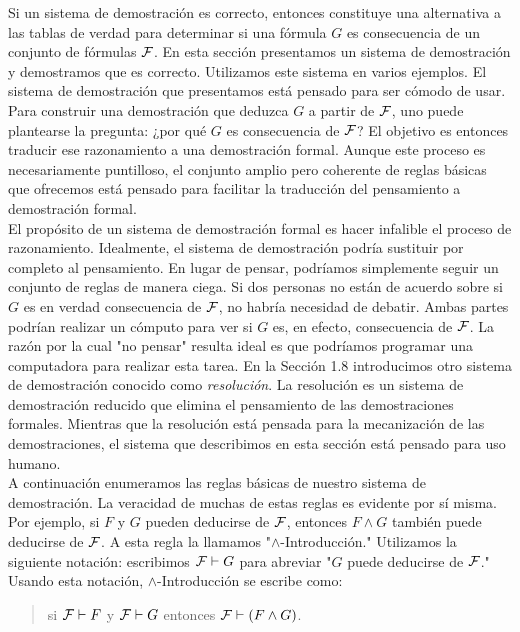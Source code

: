 \documentclass[12pt,a4paper]{book}
\newcommand{\comillas}[1]{"#1"}
\begin{document}
    Si un sistema de demostración es correcto, entonces constituye una alternativa a las tablas de verdad para determinar si una
    fórmula $G$ es consecuencia de un conjunto de fórmulas $\mathcal{F}$. En esta sección presentamos un sistema de demostración y
    demostramos que es correcto. Utilizamos este sistema en varios ejemplos. El sistema de demostración que presentamos está
    pensado para ser cómodo de usar. Para construir una demostración que deduzca $G$ a partir de $\mathcal{F}$, uno puede plantearse la
    pregunta: ¿por qué $G$ es consecuencia de $\mathcal{F}$? El objetivo es entonces traducir ese razonamiento a una demostración formal.
    Aunque este proceso es necesariamente puntilloso, el conjunto amplio pero coherente de reglas básicas que ofrecemos está
    pensado para facilitar la traducción del pensamiento a demostración formal.\\
    El propósito de un sistema de demostración formal es hacer infalible el proceso de razonamiento. Idealmente, el sistema de
    demostración podría sustituir por completo al pensamiento. En lugar de pensar, podríamos simplemente seguir un conjunto de
    reglas de manera ciega. Si dos personas no están de acuerdo sobre si $G$ es en verdad consecuencia de $\mathcal{F}$, no habría
    necesidad de debatir. Ambas partes podrían realizar un cómputo para ver si $G$ es, en efecto, consecuencia de $\mathcal{F}$. La razón
    por la cual \comillas{no pensar} resulta ideal es que podríamos programar una computadora para realizar esta tarea. En la
    Sección 1.8 introducimos otro sistema de demostración conocido como \textit{resolución}. La resolución es un sistema de
    demostración reducido que elimina el pensamiento de las demostraciones formales. Mientras que la resolución está pensada
    para la mecanización de las demostraciones, el sistema que describimos en esta sección está pensado para uso humano.\\
    A continuación enumeramos las reglas básicas de nuestro sistema de demostración. La veracidad de muchas de estas reglas es
    evidente por sí misma. Por ejemplo, si $F$ y $G$ pueden deducirse de $\mathcal{F}$, entonces $F\wedge G$ también puede deducirse de
    $\mathcal{F}$. A esta regla la llamamos \comillas{$\wedge$-Introducción.} Utilizamos la siguiente notación: escribimos $\mathcal{F}\vdash G$
    para abreviar \comillas{$G$ puede deducirse de $\mathcal{F}$.} Usando esta notación, $\wedge$-Introducción se escribe como:

    \begin{quote}
        si $\mathcal{F}\vdash F$ y $\mathcal{F}\vdash G$ entonces $\mathcal{F}\vdash(F\wedge G)$.
    \end{quote}
\end{document}
